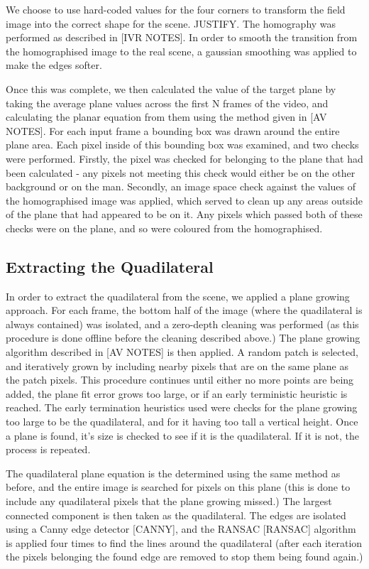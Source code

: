 \documentclass[11pt]{article}
\begin{document}
We choose to use hard-coded values for the four corners to transform the field
image into the correct shape for the scene. JUSTIFY. The homography was
performed as described in [IVR NOTES]. In order to smooth the transition from
the homographised image to the real scene, a gaussian smoothing was applied to
make the edges softer.

Once this was complete, we then calculated the value of the target plane by
taking the average plane values across the first N frames of the video, and
calculating the planar equation from them using the method given in [AV NOTES].
For each input frame a bounding box was drawn around the entire plane area.
Each pixel inside of this bounding box was examined, and two checks were
performed. Firstly, the pixel was checked for belonging to the plane that had
been calculated - any pixels not meeting this check would either be on the
other background or on the man. Secondly, an image space check against the
values of the homographised image was applied, which served to clean up any
areas outside of the plane that had appeared to be on it. Any pixels which
passed both of these checks were on the plane, and so were coloured from the
homographised.

\subsection{Extracting the Quadilateral}

In order to extract the quadilateral from the scene, we applied a plane growing
approach. For each frame, the bottom half of the image (where the quadilateral
is always contained) was isolated, and a zero-depth cleaning was performed (as
this procedure is done offline before the cleaning described above.) The plane
growing algorithm described in [AV NOTES] is then applied. A random patch is
selected, and iteratively grown by including nearby pixels that are on the same
plane as the patch pixels. This procedure continues until either no more points
are being added, the plane fit error grows too large, or if an early
terministic heuristic is reached. The early termination heuristics used were
checks for the plane growing too large to be the quadilateral, and for it
having too tall a vertical height. Once a plane is found, it's size is checked
to see if it is the quadilateral. If it is not, the process is repeated.

The quadilateral plane equation is the determined using the same method as
before, and the entire image is searched for pixels on this plane (this is done
to include any quadilateral pixels that the plane growing missed.) The largest
connected component is then taken as the quadilateral. The edges are isolated
using a Canny edge detector [CANNY], and the RANSAC [RANSAC] algorithm is
applied four times to find the lines around the quadilateral (after each
iteration the pixels belonging the found edge are removed to stop them being
found again.)
\end{document}
